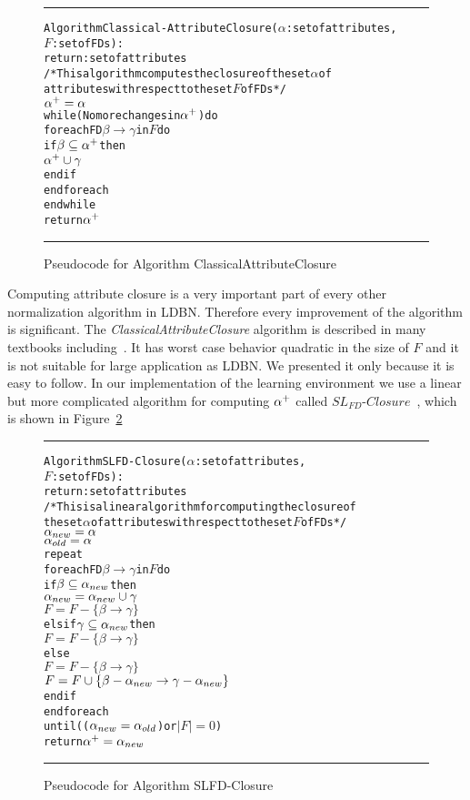 \begin{figure}[htbp]
\hrule
\vspace{0.25cm}
\begin{alltt}
Algorithm Classical-AttributeClosure(\(\alpha\): set of attributes, 
              \(F\): set of FDs):
           return: set of attributes
/* This algorithm computes the closure of the set \(\alpha\) of
    attributes with respect to the set  \(F\) of FDs */
  \(\alpha\sp{+} = \alpha\)
  while(No more changes in \(\alpha\sp{+}\)) do
    foreach FD \(\beta \rightarrow \gamma\) in \(F\) do
      if \(\beta \subseteq \alpha\sp{+}\) then 
        \(\alpha\sp{+} \cup \gamma\)
      end if
    end foreach
  end while
  return \(\alpha\sp{+}\)
\end{alltt} 
\caption{Pseudocode for Algorithm ClassicalAttributeClosure}\label{fig:attclosure}
\hrule
\end{figure}

Computing attribute closure is a very important part of every other normalization algorithm 
in LDBN. Therefore every improvement 
of the algorithm is significant. 
The \textit{ClassicalAttributeClosure} algorithm is described in many textbooks including~\cite{bdb1, bdb2, bdb4}.
It has worst case behavior quadratic in the size of $F$ and
it is not suitable for large application as LDBN. We presented it only because it is
easy to follow. In our implementation of the learning environment we use a linear but more complicated 
algorithm for computing $\alpha\sp{+}$ 
called $SL_{FD}$-$Closure$~\cite{p10}, which is shown in Figure~\ref{alg:slfdclosure}

\begin{figure}[htbp]
\hrule
\vspace{0.25cm}
\begin{alltt}
Algorithm SLFD-Closure(\(\alpha\): set of attributes, 
              \(F\): set of FDs):
           return: set of attributes
/* This is a linear algorithm for computing the closure of 
  the set \(\alpha\) of attributes with respect to the set \(F\) of FDs */
  \(\alpha\sb{new} = \alpha\)
  \(\alpha\sb{old} = \alpha\)
  repeat
    foreach FD \(\beta \rightarrow \gamma\) in \(F\) do
      if \(\beta \subseteq \alpha\sb{new}\) then 
        \(\alpha\sb{new} = \alpha\sb{new} \cup \gamma\)
        \(F = F - \{\beta \rightarrow \gamma\}\) 
      elsif \(\gamma \subseteq \alpha\sb{new}\) then
        \(F = F - \{\beta \rightarrow \gamma\}\) 
      else
        \(F = F - \{\beta \rightarrow \gamma\}\) 
        \(F = F \cup \{\beta-\alpha\sb{new} \rightarrow \gamma-\alpha\sb{new}\}\) 
      end if
    end foreach 
  until ((\(\alpha\sb{new} = \alpha\sb{old}\)) or \(|F| = 0\))
  return \(\alpha\sp{+} = \alpha\sb{new}\)
\end{alltt} 
\caption{Pseudocode for Algorithm SLFD-Closure}\label{alg:slfdclosure}
\hrule
\end{figure}

